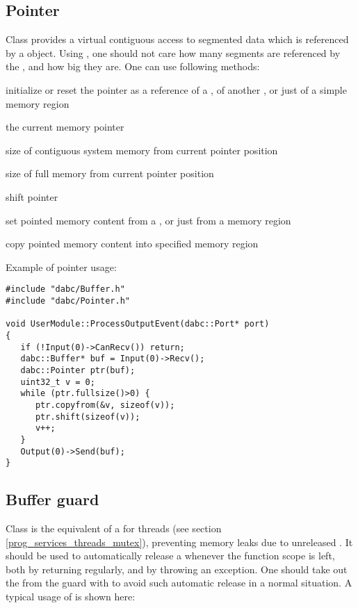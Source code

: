 \subsection{Pointer}
\label{prog_services_memory_pointer}
Class  provides a virtual contiguous access to 
segmented data which is referenced by a  object.
Using , one should not care how many segments are 
referenced by the , and how big they are. One can use following methods:
\bbul
\item[\func{Pointer()} or \func{reset()}]  initialize or reset the pointer as a reference of a , of another , or just of a simple memory region   

\item[\func{ptr()} or \func{operator()}]   the current memory pointer

\item[\func{rawsize()}]   size of contiguous system memory from current pointer position  

\item[\func{fullsize()}]  size of full memory from current pointer position

\item[\func{shift()}]  shift pointer    

\item[\func{copyfrom()}]  set pointed memory content from a , 
or just from a memory region

\item[\func{copyto()}]  copy pointed memory content into specified memory region
\ebul   

Example of pointer usage:

\begin{small}
\begin{verbatim}     
#include "dabc/Buffer.h"
#include "dabc/Pointer.h"

void UserModule::ProcessOutputEvent(dabc::Port* port)
{
   if (!Input(0)->CanRecv()) return;
   dabc::Buffer* buf = Input(0)->Recv();
   dabc::Pointer ptr(buf);
   uint32_t v = 0; 
   while (ptr.fullsize()>0) {
      ptr.copyfrom(&v, sizeof(v));
      ptr.shift(sizeof(v));
      v++;
   }
   Output(0)->Send(buf);
}
\end{verbatim}     
\end{small}



\subsection{Buffer guard}
\label{prog_services_memory_bufferguard}
Class 
is the equivalent of a  for threads (see section
\ref{prog_services_threads_mutex}),
preventing memory leaks due to unreleased .
It should be used to automatically release a 
whenever the function scope is left, both by returning regularly, 
and by throwing an exception. 
One should  take out the  from the guard
with 
to avoid such automatic release in a normal situation. A typical usage 
of  is shown here:

